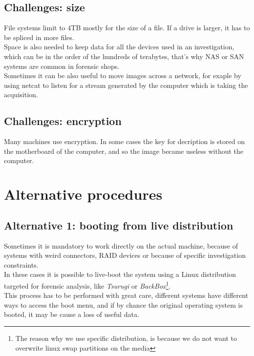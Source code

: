     \subsection{Challenges: size}
        File systems limit to 4TB mostly for the size of a file. If a drive is larger, it has to be spliced in more files.\\
        Space is also needed to keep data for all the devices used in an investigation, which can be in the order of the hundreds of terabytes, that's why NAS or SAN systems are common in forensic shops.\\
        Sometimes it can be also useful to move images across a network, for exaple by using netcat to listen for a stream generated by the computer which is taking the acquisition.
    \subsection{Challenges: encryption}
        Many machines use encryption. In some cases the key for decription is stored on the motherboard of the computer, and so the image became useless without the computer.
\section{Alternative procedures}
    \subsection{Alternative 1: booting from live distribution}
        Sometimes it is mandatory to work directly on the actual machine, because of systems with weird connectors, RAID devices or because of specific investigation constraints.\\
        In these cases it is possible to live-boot the system using a Linux distribution targeted for forensic analysis, like \textit{Tsurugi} or \textit{BackBox}\footnote{The reason why we use specific distribution, is because we do not want to overwrite linux swap partitions on the media}.\\
        This process has to be performed with great care, different systems have different ways to access the boot menu, and if by chance the original operating system is booted, it may be cause a loss of useful data.